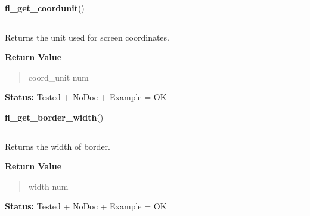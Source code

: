     \label{xformslib:library:fl_get_coordunit}

    \vspace{0.5ex}

\hspace{.8\funcindent}\begin{boxedminipage}{\funcwidth}

    \raggedright \textbf{fl\_get\_coordunit}()

    \vspace{-1.5ex}

    \rule{\textwidth}{0.5\fboxrule}
\setlength{\parskip}{2ex}
    Returns the unit used for screen coordinates.

\setlength{\parskip}{1ex}
      \textbf{Return Value}
    \vspace{-1ex}

      \begin{quote}
      coord\_unit num

      \end{quote}

\textbf{Status:} Tested + NoDoc + Example = OK



    \end{boxedminipage}

    \label{xformslib:library:fl_get_border_width}

    \vspace{0.5ex}

\hspace{.8\funcindent}\begin{boxedminipage}{\funcwidth}

    \raggedright \textbf{fl\_get\_border\_width}()

    \vspace{-1.5ex}

    \rule{\textwidth}{0.5\fboxrule}
\setlength{\parskip}{2ex}
    Returns the width of border.

\setlength{\parskip}{1ex}
      \textbf{Return Value}
    \vspace{-1ex}

      \begin{quote}
      width num

      \end{quote}

\textbf{Status:} Tested + NoDoc + Example = OK



    \end{boxedminipage}

